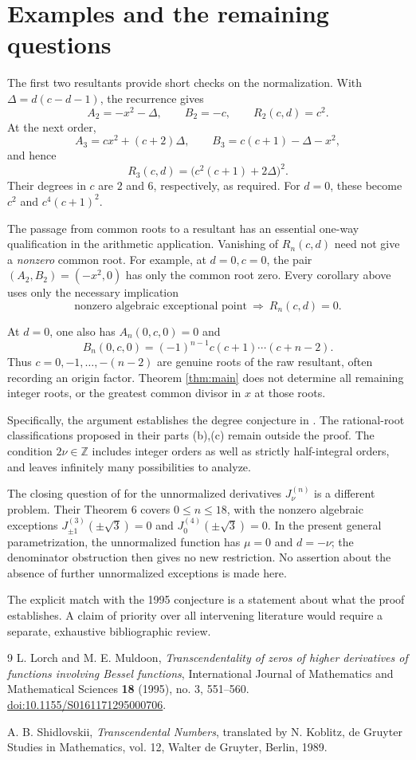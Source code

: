 \documentclass[11pt]{article}
\newcommand{\Z}{\mathbb Z}
\begin{document}
\section{Examples and the remaining questions}

The first two resultants provide short checks on the normalization.
With $\Delta=d(c-d-1)$, the recurrence gives
\[
 A_2=-x^2-\Delta,\qquad B_2=-c,
 \qquad R_2(c,d)=c^2.
\]
At the next order,
\[
 A_3=cx^2+(c+2)\Delta,\qquad
 B_3=c(c+1)-\Delta-x^2,
\]
and hence
\[
 R_3(c,d)=\bigl(c^2(c+1)+2\Delta\bigr)^2.
\]
Their degrees in $c$ are $2$ and $6$, respectively, as required.
For $d=0$, these become $c^2$ and $c^4(c+1)^2$.

The passage from common roots to a resultant has an essential one-way
qualification in the arithmetic application. Vanishing of $R_n(c,d)$
need not give a \emph{nonzero} common root. For example, at $d=0,c=0$,
the pair $(A_2,B_2)=(-x^2,0)$ has only the common root zero. Every
corollary above uses only the necessary implication
\[
 \text{nonzero algebraic exceptional point}
 \ \Longrightarrow\ R_n(c,d)=0.
\]

At $d=0$, one also has $A_n(0,c,0)=0$ and
\[
 B_n(0,c,0)=(-1)^{n-1}c(c+1)\cdots(c+n-2).
\]
Thus $c=0,-1,\ldots,-(n-2)$ are genuine roots of the raw resultant,
often recording an origin factor. Theorem \ref{thm:main} does not
determine all remaining integer roots, or the greatest common divisor
in $x$ at those roots.

Specifically, the argument establishes the degree conjecture in
\cite[Section 2.3(a)]{LM95}. The rational-root classifications proposed
in their parts (b),(c) remain outside the proof. The condition
$2\nu\in\Z$ includes integer orders as well as strictly half-integral
orders, and leaves infinitely many possibilities to analyze.

The closing question of \cite{LM95} for the unnormalized derivatives
$J_\nu^{(n)}$ is a different problem. Their Theorem 6 covers
$0\le n\le18$, with the nonzero algebraic exceptions
$J_{\pm1}^{(3)}(\pm\sqrt3)=0$ and
$J_0^{(4)}(\pm\sqrt3)=0$. In the present general parametrization,
the unnormalized function has $\mu=0$ and $d=-\nu$; the denominator
obstruction then gives no new restriction. No assertion about the
absence of further unnormalized exceptions is made here.

The explicit match with the 1995 conjecture is a statement about what
the proof establishes. A claim of priority over all intervening
literature would require a separate, exhaustive bibliographic review.

\begin{thebibliography}{9}
L. Lorch and M. E. Muldoon,
\emph{Transcendentality of zeros of higher derivatives of functions
involving Bessel functions},
International Journal of Mathematics and Mathematical Sciences
\textbf{18} (1995), no. 3, 551--560.
\href{https://doi.org/10.1155/S0161171295000706}{doi:10.1155/S0161171295000706}.

A. B. Shidlovskii,
\emph{Transcendental Numbers}, translated by N. Koblitz,
de Gruyter Studies in Mathematics, vol. 12,
Walter de Gruyter, Berlin, 1989.
\end{thebibliography}
\end{document}
